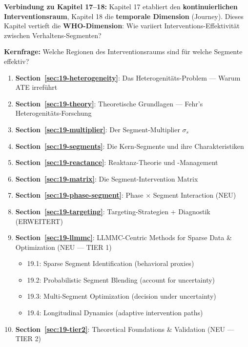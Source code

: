 \begin{tcolorbox}[colback=green!5!white, colframe=green!75!black,
    title=Chapter Overview]

\textbf{Verbindung zu Kapitel 17--18:} Kapitel 17 etabliert den \textbf{kontinuierlichen Interventionsraum}, Kapitel 18 die \textbf{temporale Dimension} (Journey). Dieses Kapitel vertieft die \textbf{WHO-Dimension}: Wie variiert Interventions-Effektivit\"{a}t zwischen Verhaltens-Segmenten?

\textbf{Kernfrage:} Welche Regionen des Interventionsraums sind f\"{u}r welche Segmente effektiv?

\begin{enumerate}
\item \textbf{Section~\ref{sec:19-heterogeneity}}: Das Heterogenit\"{a}ts-Problem --- Warum ATE irref\"{u}hrt
\item \textbf{Section~\ref{sec:19-theory}}: Theoretische Grundlagen --- Fehr's Heterogenit\"{a}ts-Forschung
\item \textbf{Section~\ref{sec:19-multiplier}}: Der Segment-Multiplier $\sigma_s$
\item \textbf{Section~\ref{sec:19-segments}}: Die Kern-Segmente und ihre Charakteristiken
\item \textbf{Section~\ref{sec:19-reactance}}: Reaktanz-Theorie und -Management
\item \textbf{Section~\ref{sec:19-matrix}}: Die Segment-Intervention Matrix
\item \textbf{Section~\ref{sec:19-phase-segment}}: Phase $\times$ Segment Interaction (NEU)
\item \textbf{Section~\ref{sec:19-targeting}}: Targeting-Strategien + Diagnostik (ERWEITERT)
\item \textbf{Section~\ref{sec:19-llmmc}}: LLMMC-Centric Methods for Sparse Data \& Optimization (NEU --- TIER 1)
  \begin{itemize}[nosep]
  \item 19.1: Sparse Segment Identification (behavioral proxies)
  \item 19.2: Probabilistic Segment Blending (account for uncertainty)
  \item 19.3: Multi-Segment Optimization (decision under uncertainty)
  \item 19.4: Longitudinal Dynamics (adaptive intervention paths)
  \end{itemize}
\item \textbf{Section~\ref{sec:19-tier2}}: Theoretical Foundations \& Validation (NEU --- TIER 2)

\end{enumerate}
\end{tcolorbox}
